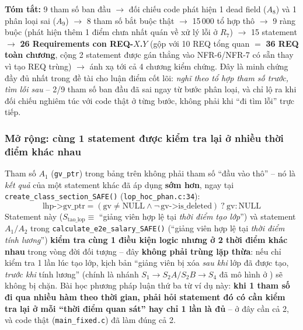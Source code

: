 \textbf{Tóm tắt:} 9 tham số ban đầu $\to$ đối chiếu code phát hiện 1 dead field ($A_8$) và 1 phân loại sai ($A_9$) $\to$ 8 tham số bắt buộc thật $\to$ 15\,000 tổ hợp thô $\to$ 9 ràng buộc (phát hiện thêm 1 điểm chưa nhất quán về xử lý lỗi ở $R_7$) $\to$ 15 statement $\to$ \textbf{26 Requirements con REQ-$X$.$Y$} (gộp với 10 REQ tổng quan $=$ \textbf{36 REQ toàn chương}, cộng 2 statement được gán thẳng vào NFR-6/NFR-7 có sẵn thay vì tạo REQ trùng) $\to$ ánh xạ tới cả 4 chương kiểm chứng. Đây là minh chứng đầy đủ nhất trong đề tài cho luận điểm cốt lõi: \emph{nghĩ theo tổ hợp tham số trước, tìm lỗi sau} -- 2/9 tham số ban đầu đã sai ngay từ bước phân loại, và chỉ lộ ra khi đối chiếu nghiêm túc với code thật ở từng bước, không phải khi ``đi tìm lỗi'' trực tiếp.

\subsubsection*{Mở rộng: cùng 1 statement được kiểm tra lại ở nhiều thời điểm khác nhau}

Tham số $A_1$ (\texttt{gv\_ptr}) trong bảng trên không phải tham số ``đầu vào thô'' -- nó là \emph{kết quả} của một statement khác đã áp dụng \textbf{sớm hơn}, ngay tại \texttt{create\_class\_section\_SAFE()} (\texttt{lop\_hoc\_phan.c:34}):
\[
\text{lhp->gv\_ptr} = (\text{gv} \ne \text{NULL} \land \lnot\,\text{gv->is\_deleted})\ ?\ \text{gv} : \text{NULL}
\]
Statement này ($S_{\text{tao\_lop}} \equiv$ ``giảng viên hợp lệ tại \emph{thời điểm tạo lớp}'') và statement $A_1/A_2$ trong \texttt{calculate\_e2e\_salary\_SAFE()} (``giảng viên hợp lệ tại \emph{thời điểm tính lương}'') \textbf{kiểm tra cùng 1 điều kiện logic nhưng ở 2 thời điểm khác nhau} trong vòng đời đối tượng -- đây \textbf{không phải trùng lặp thừa}: nếu chỉ kiểm tra 1 lần lúc tạo lớp, kịch bản ``giảng viên bị xóa \emph{sau khi} lớp đã được tạo, \emph{trước khi} tính lương'' (chính là nhánh $S_1 \to S_2A/S_2B \to S_4$ đã mô hình ở ) sẽ không bị chặn. Bài học phương pháp luận thứ ba từ ví dụ này: \textbf{khi 1 tham số đi qua nhiều hàm theo thời gian, phải hỏi statement đó có cần kiểm tra lại ở mỗi ``thời điểm quan sát'' hay chỉ 1 lần là đủ} -- ở đây cần cả 2, và code thật (\texttt{main\_fixed.c}) đã làm đúng cả 2.
